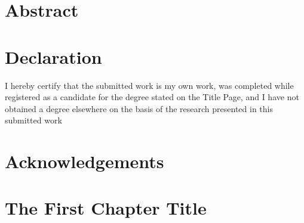 \documentclass[11pt, oneside]{report} %
\providecommand\phantomsection{}
\begin{document}
 


\cleardoublepage

\tableofcontents %
\cleardoublepage

\chapter*{Abstract} %
\phantomsection
{}

\cleardoublepage

\chapter*{Declaration} %
\phantomsection
{}
I hereby certify that the submitted work is my own work, was completed
while registered as a candidate for the degree stated on the Title Page, and I have not obtained a
degree elsewhere on the basis of the research presented in this submitted work
\cleardoublepage

\chapter*{Acknowledgements} %
\phantomsection
{}

\cleardoublepage

\phantomsection
{}
\listoffigures
\cleardoublepage

\phantomsection
{}
\listoftables
\cleardoublepage

\phantomsection
\printglossary[title={List of Abbreviations},type=\acronymtype,style=listdotted]
\cleardoublepage



\chapter{The First Chapter Title} \label{chap:first_chap} %
\cleardoublepage
\end{document}
